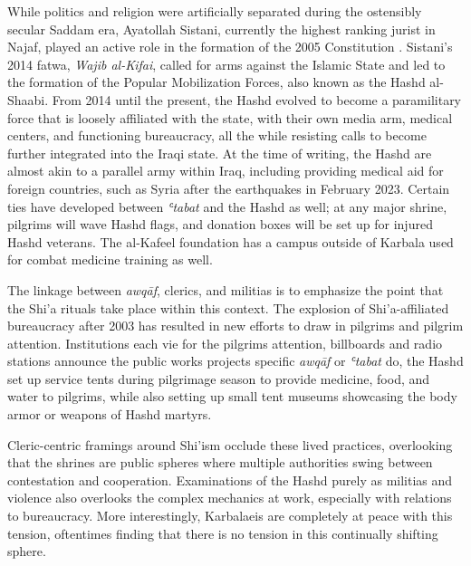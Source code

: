 
While politics and religion were artificially separated during the ostensibly secular Saddam era, Ayatollah Sistani, currently the highest ranking jurist in Najaf, played an active role in the formation of the 2005 Constitution \cite[146]{nakash_reaching_2006}. Sistani's 2014 fatwa, \emph{Wajib al-Kifai}, called for arms against the Islamic State and led to the formation of the Popular Mobilization Forces, also known as the Hashd al-Shaabi. From 2014 until the present, the Hashd evolved to become a paramilitary force that is loosely affiliated with the state, with their own media arm, medical centers, and functioning bureaucracy, all the while resisting calls to become further integrated into the Iraqi state. At the time of writing, the Hashd are almost akin to a parallel army within Iraq, including providing medical aid for foreign countries, such as Syria after the earthquakes in February 2023. Certain ties have developed between \emph{ʿtabat} and the Hashd as well; at any major shrine, pilgrims will wave Hashd flags, and donation boxes will be set up for injured Hashd veterans. The al-Kafeel foundation has a campus outside of Karbala used for combat medicine training as well. 

The linkage between \emph{awqāf}, clerics, and militias is to emphasize the point that the Shi'a rituals take place within this context. The explosion of Shi'a-affiliated bureaucracy after 2003 has resulted in new efforts to draw in pilgrims and pilgrim attention. Institutions each vie for the pilgrims attention, billboards and radio stations announce the public works projects specific \emph{awqāf} or \emph{ʿtabat} do, the Hashd set up service tents during pilgrimage season to provide medicine, food, and water to pilgrims, while also setting up small tent museums showcasing the body armor or weapons of Hashd martyrs. 

Cleric-centric framings around Shi'ism occlude these lived practices, overlooking that the shrines are public spheres where multiple authorities swing between contestation and cooperation. Examinations of the Hashd purely as militias and violence also overlooks the complex mechanics at work, especially with relations to bureaucracy. More interestingly, Karbalaeis are completely at peace with this tension, oftentimes finding that there is no tension in this continually shifting sphere.

